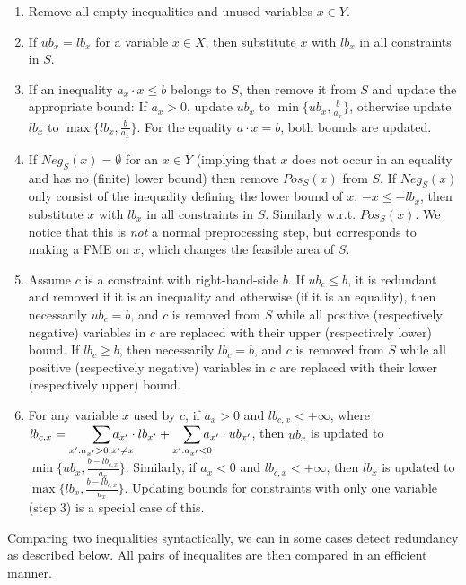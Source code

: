 \documentclass[citeauthoryear]{llncs}
\newcommand{\Pos}{\mathit{Pos}}
\newcommand{\Neg}{\mathit{Neg}}
\newcommand{\mi}{\mathit}
\newcounter{counterName}
\begin{document}
\begin{enumerate} \itemsep0em
	\item Remove all empty inequalities and unused variables $x\in Y$.
%
	\item If $ub_x = lb_x$ for a variable $x\in X$, then substitute $x$ with $lb_x$ in all constraints in $S$. 
%
	\item If an inequality $a_x\cdot x \leq b$ belongs to $S$, then remove it from $S$ and update the appropriate bound: If $a_x>0$, update $ub_x$ to $\min\{ub_x,\frac{b}{a_x}\}$, otherwise update $lb_x$ to $\max\{lb_x,\frac{b}{a_x}\}$.
For the equality $a\cdot x = b$, both bounds are updated.
%
	\item If $\Neg_S(x)=\emptyset$ for an $x\in Y$ (implying that $x$ does not occur in an equality and has no (finite) lower bound) then remove $\Pos_S(x)$ from $S$. If $\Neg_S(x)$ only consist of the inequality defining the lower bound of $x$, $-x\leq -lb_x$, then substitute $x$ with $lb_x$ in all constraints in $S$. Similarly w.r.t. $\Pos_S(x)$. We notice that this is \emph{not} a normal preprocessing step, but corresponds to making a FME on $x$, which changes the feasible area of $S$. 
%
	\item Assume $c$ is a constraint with right-hand-side $b$. If ${ub}_c \leq b$, it is redundant and removed if it is an inequality and otherwise (if it is an equality), then necessarily ${ub}_c = b$, and $c$ is removed from $S$ while all positive (respectively negative) variables in $c$ are replaced with their upper (respectively lower) bound.
If $\mi{lb}_c \geq b$, then necessarily $\mi{lb}_c = b$, and $c$ is removed from $S$ while all positive (respectively negative) variables in $c$ are replaced with their lower (respectively upper) bound.
%
	\item For any variable $x$ used by $c$, if $a_x > 0$ and $\mi{lb}_{c,x}<+\infty$, 
	where $\mi{lb}_{c,x} = \smashoperator[r]{\sum_{x'.a_{x'}>0, x'\neq x}}a_{x'}\cdot lb_{x'} + \smashoperator[r]{\sum_{x'.a_{x'}<0}}a_{x'}\cdot ub_{x'}$, 
	then $ub_x$ is updated to $\min\{ub_x, \frac{b-\mathit{lb}_{c,x}}{a_x}\}$. 
	Similarly, if $a_x < 0$ and $\mi{lb}_{c,x}<+\infty$, then $lb_x$ is updated to $\max\{lb_x, \frac{b-\mathit{lb}_{c,x}}{a_x}\}$.	
	Updating bounds for constraints with only one variable (step 3) is a special case of this.
\setcounter{counterName}{\value{enumi}}
\end{enumerate}	
%
Comparing two inequalities syntactically, we can in some cases detect redundancy as described below. All pairs of inequalites are then compared in an efficient manner.
\end{document}
